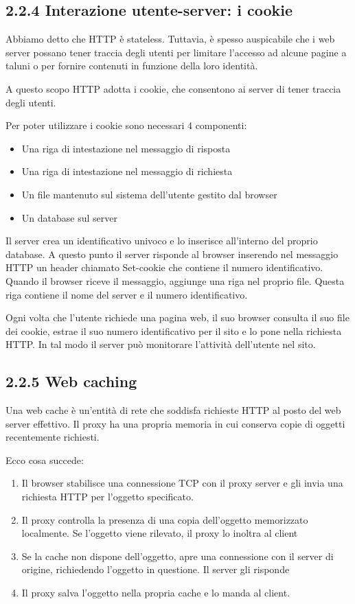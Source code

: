 \documentclass{book}
\begin{document}
\subsection*{2.2.4 Interazione utente-server: i cookie}
Abbiamo detto che HTTP è stateless. Tuttavia, è spesso auspicabile che i web server possano tener traccia degli utenti per limitare l'accesso ad alcune pagine a taluni o per fornire contenuti in funzione della loro identità.

A questo scopo HTTP adotta i cookie, che consentono ai server di tener traccia degli utenti.

Per poter utilizzare i cookie sono necessari 4 componenti:
\begin{itemize}
	\item Una riga di intestazione nel messaggio di risposta
	\item Una riga di intestazione nel messaggio di richiesta
	\item Un file mantenuto sul sistema dell'utente gestito dal browser
	\item Un database sul server
\end{itemize}

Il server crea un identificativo univoco e lo inserisce all'interno del proprio database. A questo punto il server risponde al browser inserendo nel messaggio HTTP un header chiamato Set-cookie che contiene il numero identificativo. Quando il browser riceve il messaggio, aggiunge una riga nel proprio file. Questa riga contiene il nome del server e il numero identificativo.

Ogni volta che l'utente richiede una pagina web, il suo browser consulta il suo file dei cookie, estrae il suo numero identificativo per il sito e lo pone nella richiesta HTTP. In tal modo il server può monitorare l'attività dell'utente nel sito.

\subsection*{2.2.5 Web caching}
Una web cache è un'entità di rete che soddisfa richieste HTTP al posto del web server effettivo. Il proxy ha una propria memoria in cui conserva copie di oggetti recentemente richiesti.

Ecco cosa succede:
\begin{enumerate}
	\item Il browser stabilisce una connessione TCP con il proxy server e gli invia una richiesta HTTP per l'oggetto specificato.
	\item Il proxy controlla la presenza di una copia dell'oggetto memorizzato localmente. Se l'oggetto viene rilevato, il proxy lo inoltra al client
	\item Se la cache non dispone dell'oggetto, apre una connessione con il server di origine, richiedendo l'oggetto in questione. Il server gli risponde
	\item Il proxy salva l'oggetto nella propria cache e lo manda al client.
\end{enumerate}
\end{document}
